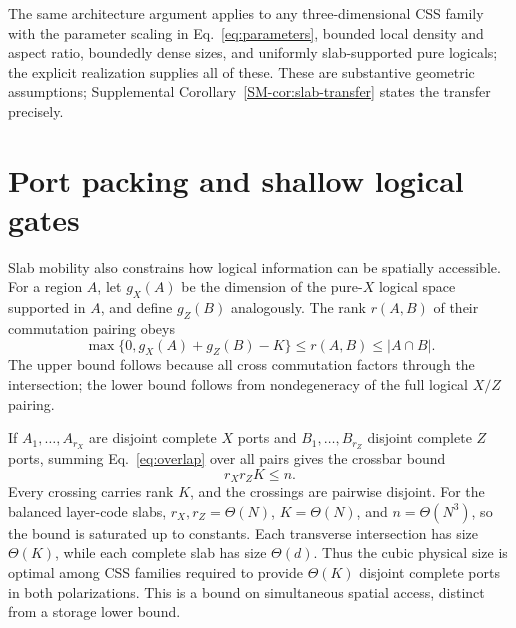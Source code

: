 The same architecture argument applies to any three-dimensional CSS
family with the parameter scaling in Eq.~\eqref{eq:parameters}, bounded
local density and aspect ratio, boundedly dense sizes, and uniformly
slab-supported pure logicals; the explicit realization supplies all of these. These are substantive geometric assumptions;
Supplemental Corollary~\ref{SM-cor:slab-transfer} states the transfer precisely.

\section{Port packing and shallow logical gates}
\label{sec:structure}
Slab mobility also constrains how logical information can be spatially
accessible. For a region $A$, let $g_X(A)$ be the dimension of the pure-$X$
logical space supported in $A$, and define $g_Z(B)$ analogously. The rank
$r(A,B)$ of their commutation pairing obeys
\begin{equation}
 \max\{0,g_X(A)+g_Z(B)-K\}\le r(A,B)\le |A\cap B|.
 \label{eq:overlap}
\end{equation}
The upper bound follows because all cross commutation factors through the
intersection; the lower bound follows from nondegeneracy of the full
logical $X/Z$ pairing.

If $A_1,\ldots,A_{r_X}$ are disjoint complete $X$ ports and
$B_1,\ldots,B_{r_Z}$ disjoint complete $Z$ ports, summing
Eq.~\eqref{eq:overlap} over all pairs gives the crossbar bound
\begin{equation}
 r_Xr_ZK\le n.
 \label{eq:crossbar}
\end{equation}
Every crossing carries rank $K$, and the crossings are pairwise disjoint.
For the balanced layer-code slabs,
$r_X,r_Z=\Theta(N)$, $K=\Theta(N)$, and $n=\Theta(N^3)$, so the bound is
saturated up to constants. Each transverse intersection has size
$\Theta(K)$, while each complete slab has size $\Theta(d)$. Thus the cubic
physical size is optimal among CSS families required to provide
$\Theta(K)$ disjoint complete ports in both polarizations. This is a bound
on simultaneous spatial access, distinct from a storage lower bound.


